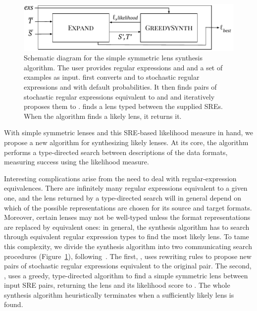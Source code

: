 \documentclass[12pt]{article}
\begin{document}
{\begin{figure}
 \centering
  \includegraphics[width=.63\textwidth]{high-level-algorithm.pdf}
  \vspace{-2ex}
  \caption{Schematic diagram for the simple symmetric lens synthesis algorithm.
    The user provides regular expressions \BRegex and \BRegexAlt and a set of
    examples \Examples{} as input. \Expand first converts \BRegex and \BRegexAlt
    to stochastic regular expressions \Regex and \RegexAlt with default
    probabilities. It then finds pairs of stochastic regular expressions
    equivalent to \Regex and \RegexAlt and iteratively proposes them to
    \GreedySynth. \GreedySynth finds a lens typed between the supplied SREs.
    When the algorithm finds a likely lens, it returns it.}
  \label{fig:high-level-algorithm}
\end{figure}

With simple symmetric lenses and this SRE-based likelihood measure in hand, we
propose a new algorithm for synthesizing likely lenses. At its core, the
algorithm performs a type-directed search between descriptions of the data
formats, measuring success using the likelihood measure.

Interesting complications arise from the need to deal with regular-expression
equivalences. There are infinitely many regular expressions equivalent to a
given one, and the lens returned by a type-directed search will in general
depend on which of the possible representations are chosen for its source and
target formats. Moreover, certain lenses may not be well-typed unless the
format representations are replaced by equivalent ones:
in general, the synthesis algorithm has to search through
equivalent regular expression types to find the most likely lens. To tame
this complexity, we divide the synthesis algorithm into two communicating search
procedures (Figure~\ref{fig:high-level-algorithm}), following~\cite{optician}.
The first, \Expand, uses rewriting rules to propose new pairs of
stochastic regular expressions equivalent to the original pair. The second,
\GreedySynth, uses a greedy, type-directed
algorithm to find a simple symmetric lens between input SRE pairs, returning the lens and
its likelihood score to \Expand. The whole synthesis algorithm heuristically
terminates when a sufficiently likely lens is found.



}
\end{document}
